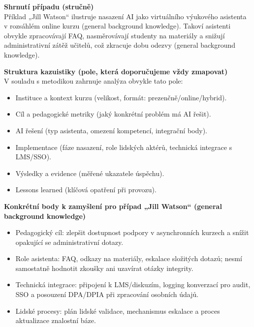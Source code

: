 \documentclass{report}%
\begin{document}
%
\medskip

\textbf{Shrnutí případu (stručně)}\\
Příklad „Jill Watson“ ilustruje nasazení AI jako virtuálního výukového asistenta v rozsáhlém online kurzu (general background knowledge). Takoví asistenti obvykle zpracovávají FAQ, nasměrovávají studenty na materiály a snižují administrativní zátěž učitelů, což zkracuje dobu odezvy (general background knowledge).

\bigskip
\textbf{Struktura kazuistiky (pole, která doporučujeme vždy zmapovat)}\\
V souladu s metodikou zahrnuje analýza obvykle tato pole:
\begin{itemize}
  \item Instituce a kontext kurzu (velikost, formát: prezenčně/online/hybrid).
  \item Cíl a pedagogické metriky (jaký konkrétní problém má AI řešit).
  \item AI řešení (typ asistenta, omezení kompetencí, integrační body).
  \item Implementace (fáze nasazení, role lidských aktérů, technická integrace s LMS/SSO).
  \item Výsledky a evidence (měřené ukazatele úspěchu).
  \item Lessons learned (klíčová opatření při provozu).
\end{itemize}

\bigskip
\textbf{Konkrétní body k zamyšlení pro případ „Jill Watson“ (general background knowledge)}\\
\begin{itemize}
  \item Pedagogický cíl: zlepšit dostupnost podpory v asynchronních kurzech a snížit opakující se administrativní dotazy.
  \item Role asistenta: FAQ, odkazy na materiály, eskalace složitých dotazů; nesmí samostatně hodnotit zkoušky ani uzavírat otázky integrity.
  \item Technická integrace: připojení k LMS/diskuzím, logging konverzací pro audit, SSO a posouzení DPA/DPIA při zpracování osobních údajů.
  \item Lidské procesy: plán lidské validace, mechanismus eskalace a proces aktualizace znalostní báze.
\end{itemize}
\end{document}
